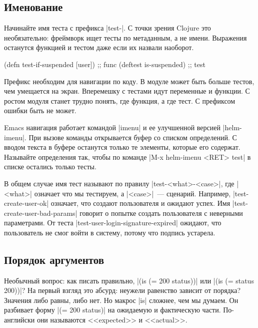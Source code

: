 \subsection{Именование}

Начинайте имя теста с префикса \spverb|test-|. С точки зрения Clojure это
необязательно: фреймворк ищет тесты по метаданным, а не имени. Выражения
останутся функцией и тестом даже если их назвали наоборот.

\begin{english}
  \begin{clojure}
(defn test-if-suspended [user]) ;; func
(deftest is-suspended)          ;; test
  \end{clojure}
\end{english}

Префикс необходим для навигации по коду. В модуле может быть больше тестов, чем
умещается на экран. Вперемешку с тестами идут переменные и функции. С ростом
модуля станет трудно понять, где функция, а где тест. С префиксом ошибки быть не
может.

Emacs навигация работает командой \spverb|imenu| и ее улучшенной версией
\spverb|helm-imenu|. При вызове команды открывается буфер со списком
определений. С вводом текста в буфере останутся только те элементы, которые его
содержат. Называйте определения так, чтобы по команде \spverb|M-x helm-imenu <RET> test|
в списке остались только тесты.

В общем случае имя тест называют по правилу \spverb|test-<what>-<case>|, где
\spverb|<what>| означает что мы тестируем, а \spverb|<case>|~---
сценарий. Например, \spverb|test-create-user-ok| означает, что создают
пользователя и ожидают успех. Имя \spverb|test-create-user-bad-params| говорит о
попытке создать пользователя с неверными параметрами. От теста
\spverb|test-user-login-signature-expired| ожидают, что пользователь не смог
войти в систему, потому что подпись устарела.

\subsection{Порядок аргументов}

Необычный вопрос: как писать правильно, \spverb|(is (= 200 status))| или
\spverb|(is (= status 200))|? На первый взгляд это абсурд: неужели равенство
зависит от порядка? Значения либо равны, либо нет. Но макрос \spverb|is|
сложнее, чем мы думаем. Он разбивает форму \spverb|(= 200 status)| на ожидаемую
и фактическую части. По-английски они называются <<expected>> и <<actual>>.

